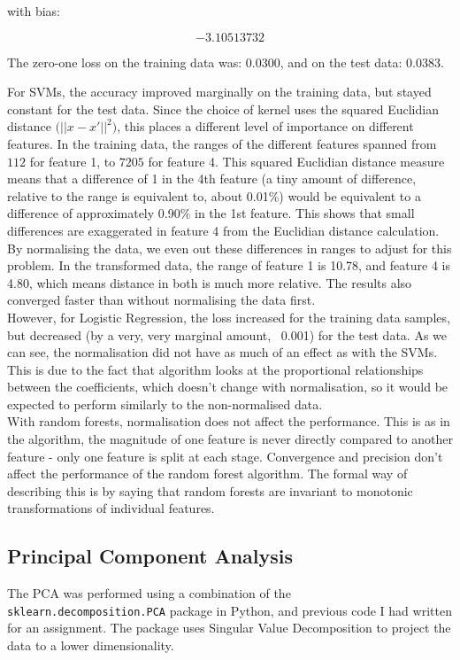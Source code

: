 \documentclass{scrartcl}
\begin{document}
with bias:

\[ -3.10513732 \]

The zero-one loss on the training data was: $0.0300$, and on the test data: $0.0383$.

For SVMs, the accuracy improved marginally on the training data, but stayed constant for the test data. Since the choice of kernel uses the squared Euclidian distance $\big( || x - x' || ^2 \big)$, this places a different level of importance on different features. In the training data, the ranges of the different features spanned from $112$ for feature 1, to $7205$ for feature 4. This squared Euclidian distance measure means that a difference of 1 in the 4th feature (a tiny amount of difference, relative to the range is equivalent to, about 0.01\%) would be equivalent to a difference of approximately 0.90\% in the 1st feature. This shows that small differences are exaggerated in feature 4 from the Euclidian distance calculation. By normalising the data, we even out these differences in ranges to adjust for this problem. In the transformed data, the range of feature 1 is 10.78, and feature 4 is 4.80, which means distance in both is much more relative. The results also converged faster than without normalising the data first. \\

However, for Logistic Regression, the loss increased for the training data samples, but decreased (by a very, very marginal amount, ~0.001) for the test data. As we can see, the normalisation did not have as much of an effect as with the SVMs. This is due to the fact that algorithm looks at the proportional relationships between the coefficients, which doesn't change with normalisation, so it would be expected to perform similarly to the non-normalised data. \\

With random forests, normalisation does not affect the performance. This is as in the algorithm, the magnitude of one feature is never directly compared to another feature - only one feature is split at each stage. Convergence and precision don't affect the performance of the random forest algorithm. The formal way of describing this is by saying that random forests are invariant to monotonic transformations of individual features.\cite{so:norm}

\subsection{Principal Component Analysis}
The PCA was performed using a combination of the \texttt{sklearn.decomposition.PCA} package in Python, and previous code I had written for an assignment. The package uses Singular Value Decomposition to project the data to a lower dimensionality. \\
\end{document}

